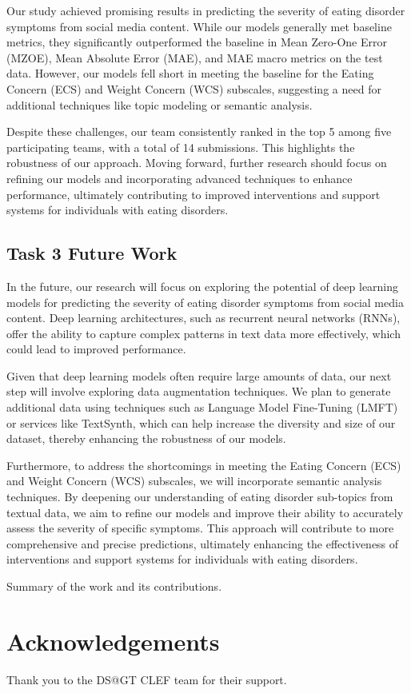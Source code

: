 \documentclass[]{style/ceurart}
\begin{document}
Our study achieved promising results in predicting the severity of eating disorder symptoms from social media content. While our models generally met baseline metrics, they significantly outperformed the baseline in Mean Zero-One Error (MZOE), Mean Absolute Error (MAE), and MAE macro metrics on the test data. However, our models fell short in meeting the baseline for the Eating Concern (ECS) and Weight Concern (WCS) subscales, suggesting a need for additional techniques like topic modeling or semantic analysis.

Despite these challenges, our team consistently ranked in the top 5 among five participating teams, with a total of 14 submissions. This highlights the robustness of our approach. Moving forward, further research should focus on refining our models and incorporating advanced techniques to enhance performance, ultimately contributing to improved interventions and support systems for individuals with eating disorders.

\subsection{Task 3 Future Work}

In the future, our research will focus on exploring the potential of deep learning models for predicting the severity of eating disorder symptoms from social media content. Deep learning architectures, such as recurrent neural networks (RNNs), offer the ability to capture complex patterns in text data more effectively, which could lead to improved performance.

Given that deep learning models often require large amounts of data, our next step will involve exploring data augmentation techniques. We plan to generate additional data using techniques such as Language Model Fine-Tuning (LMFT) or services like TextSynth, which can help increase the diversity and size of our dataset, thereby enhancing the robustness of our models.

Furthermore, to address the shortcomings in meeting the Eating Concern (ECS) and Weight Concern (WCS) subscales, we will incorporate semantic analysis techniques. By deepening our understanding of eating disorder sub-topics from textual data, we aim to refine our models and improve their ability to accurately assess the severity of specific symptoms. This approach will contribute to more comprehensive and precise predictions, ultimately enhancing the effectiveness of interventions and support systems for individuals with eating disorders.



Summary of the work and its contributions.

\section*{Acknowledgements}

Thank you to the DS@GT CLEF team for their support.



\end{document}
